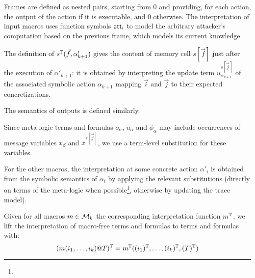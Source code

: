 Frames are defined as nested pairs, starting from $0$ and
providing, for each action, the output of the action if it is executable,
and $0$ otherwise. The interpretation of input macros uses function symbols $\mathsf{att}_i$ to model the arbitrary attacker's
computation based on the previous frame, which models its current knowledge.

The definition of $s^{\mathbb{T}}(\vec{f},\alpha'_{k+1})$ gives the content of memory
cell $s[\vec{f}]$ just after the execution of $\alpha'_{k+1}$:
it is obtained by interpreting the update term $u_{\alpha_{k+1}}^{s[\vec{j}]}$
of the associated symbolic action $\alpha_{k+1}$ mapping $\vec{i}$
and $\vec{j}$ to their expected concretizations.

The semantics of outputs is defined similarly.

Since meta-logic terms and formulas $o_{\alpha}$, $u_{\alpha}$ and
$\phi_{\alpha}$ may include occurrences of message variables
$x_\beta$ and $x^{s[\vec{j}]}$,
we use a term-level substitution for these variables.



    For the other macros, the interpretation at some concrete
    action $\alpha'_i$ is obtained from the symbolic semantics of
    $\alpha_i$ by applying the relevant substitutions (directly
    on terms of the meta-logic when possible\footnote{
    }, otherwise by updating the trace model).

Given for all macros $m \in \mathcal{M}_k$ the corresponding interpretation function $m^{\mathbb{T}}$, we lift the interpretation of macro-free terms and formulas to terms and formulas with:
    \[ (m(i_1,\dots,i_k)@T)^{\mathbb{T}} = m^{\mathbb{T}}((i_1)^{\mathbb{T}},\dots,(i_k)^{\mathbb{T}},(T)^{\mathbb{T}}) \]




